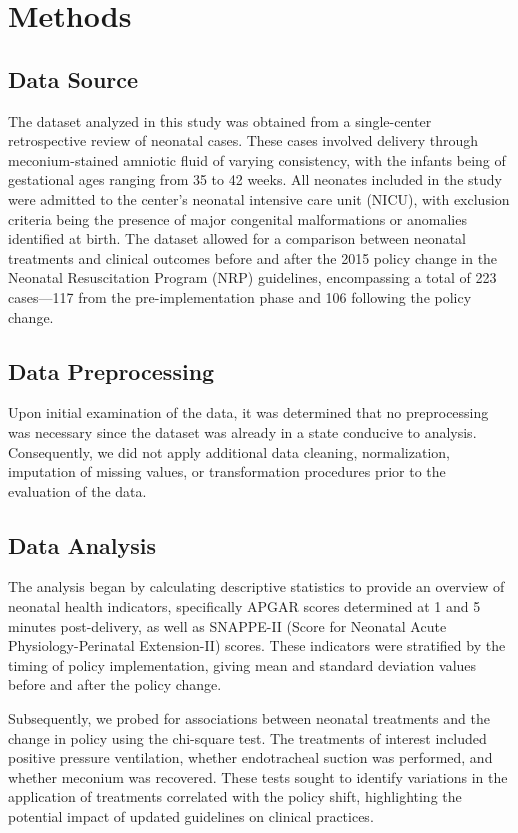 \documentclass[11pt]{article}
\begin{document}
\section*{Methods}

\subsection*{Data Source}
The dataset analyzed in this study was obtained from a single-center retrospective review of neonatal cases. These cases involved delivery through meconium-stained amniotic fluid of varying consistency, with the infants being of gestational ages ranging from 35 to 42 weeks. All neonates included in the study were admitted to the center's neonatal intensive care unit (NICU), with exclusion criteria being the presence of major congenital malformations or anomalies identified at birth. The dataset allowed for a comparison between neonatal treatments and clinical outcomes before and after the 2015 policy change in the Neonatal Resuscitation Program (NRP) guidelines, encompassing a total of 223 cases—117 from the pre-implementation phase and 106 following the policy change.

\subsection*{Data Preprocessing}
Upon initial examination of the data, it was determined that no preprocessing was necessary since the dataset was already in a state conducive to analysis. Consequently, we did not apply additional data cleaning, normalization, imputation of missing values, or transformation procedures prior to the evaluation of the data.

\subsection*{Data Analysis}
The analysis began by calculating descriptive statistics to provide an overview of neonatal health indicators, specifically APGAR scores determined at 1 and 5 minutes post-delivery, as well as SNAPPE-II (Score for Neonatal Acute Physiology-Perinatal Extension-II) scores. These indicators were stratified by the timing of policy implementation, giving mean and standard deviation values before and after the policy change. 

Subsequently, we probed for associations between neonatal treatments and the change in policy using the chi-square test. The treatments of interest included positive pressure ventilation, whether endotracheal suction was performed, and whether meconium was recovered. These tests sought to identify variations in the application of treatments correlated with the policy shift, highlighting the potential impact of updated guidelines on clinical practices.
\end{document}
